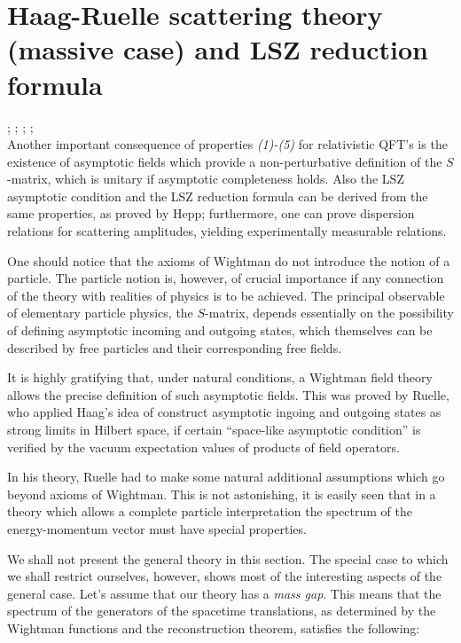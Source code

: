 \documentclass[../main/main.tex]{subfiles}
\begin{document}
\section{Haag-Ruelle scattering theory (massive case) and LSZ reduction formula}

\cite{Ruelle:1962}; \cite{Hepp:1965}; \cite[Chapter II.4]{Haag_1996}; \cite[Chapters 6]{Jost.:1965}; \cite[Sections 6.1-6.2]{Strocchi_2013}\\

Another important consequence of properties \textit{(1)-(5)} for relativistic QFT's is the existence of asymptotic fields which provide a non-perturbative definition of the $S$-matrix, which is unitary if asymptotic completeness holds. Also the LSZ asymptotic condition and the LSZ reduction formula can be derived from the same properties, as proved by Hepp; furthermore, one can prove dispersion relations for scattering amplitudes, yielding experimentally measurable relations. 

\skipline%

One should notice that the axioms of Wightman do not introduce the notion of a particle. The particle notion is, however, of crucial importance if any connection of the theory with realities of physics is to be achieved. The principal observable of elementary particle physics, the $S$-matrix, depends essentially on the possibility of defining asymptotic incoming and outgoing states, which themselves can be described by free particles and their corresponding free fields. 

It is highly gratifying that, under natural conditions, a Wightman field theory allows the precise definition of such asymptotic fields. This was proved by Ruelle, who applied Haag's idea of construct asymptotic ingoing and outgoing states as strong limits in Hilbert space, if certain ``space-like asymptotic condition'' is verified by the vacuum expectation values of products of field operators. 

In his theory, Ruelle had to make some natural additional assumptions which go beyond axioms of Wightman. This is not astonishing, it is easily seen that in a theory which allows a complete particle interpretation the spectrum of the energy-momentum vector must have special properties. 

\skipline%

We shall not present the general theory in this section. The special case to which we shall restrict ourselves, however, shows most of the interesting aspects of the general case. Let's assume that our theory has a \emph{mass gap}. This means that the spectrum of the generators of the spacetime translations, as determined by the Wightman functions and the reconstruction theorem, satisfies the following:
\end{document}
